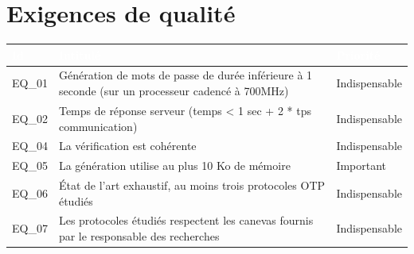 \documentclass{"../../res/univ-projet"}
\begin{document}
\section{Exigences de qualité}
\begin{tabular}{|p{}|p{}|p{}|}
    \hline
    \rowcolor{gray}
    \textcolor{white}{Id} & \textcolor{white}{Intitulé} & \textcolor{white}{Priorité}\\
    \hline
    EQ\_01 & Génération de mots de passe de durée inférieure à 1 seconde (sur un processeur cadencé à 700MHz) & Indispensable\\
    \hline
    EQ\_02 & Temps de réponse serveur (temps < 1 sec + 2 * tps communication) & Indispensable\\
    \hline
    EQ\_04 & La vérification est cohérente & Indispensable\\
    \hline
    EQ\_05 & La génération utilise au plus 10 Ko de mémoire & Important\\
    \hline
    EQ\_06 & État de l'art exhaustif, au moins trois protocoles OTP étudiés & Indispensable\\
    \hline
    EQ\_07 & Les protocoles étudiés respectent les canevas fournis par le responsable des recherches & Indispensable\\
    \hline
\end{tabular}
\end{document}
